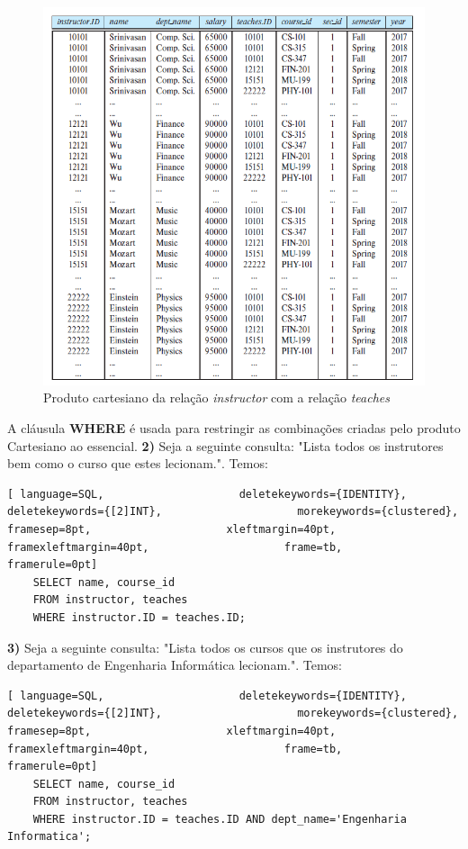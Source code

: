 \documentclass[oneside]{book}
\theoremstyle{definition}
\begin{document}
\begin{figure}[H]
    \centering
    \includegraphics[scale = 0.4]{cap2/prod_cartesiano.png}
    \caption{Produto cartesiano da relação \textit{instructor} com a relação \textit{teaches}}
\end{figure}

A cláusula \textbf{WHERE} é usada para restringir as combinações criadas pelo produto Cartesiano ao essencial.
\textbf{2)} Seja a seguinte consulta: "Lista todos os instrutores bem como o curso que estes lecionam.". Temos:
\begin{lstlisting}[ language=SQL,                     deletekeywords={IDENTITY},                     deletekeywords={[2]INT},                     morekeywords={clustered},                     framesep=8pt,                     xleftmargin=40pt,                     framexleftmargin=40pt,                     frame=tb,                     framerule=0pt]
    SELECT name, course_id
    FROM instructor, teaches
    WHERE instructor.ID = teaches.ID;
\end{lstlisting}

\textbf{3)} Seja a seguinte consulta: "Lista todos os cursos que os instrutores do departamento de Engenharia Informática lecionam.". Temos:
\begin{lstlisting}[ language=SQL,                     deletekeywords={IDENTITY},                     deletekeywords={[2]INT},                     morekeywords={clustered},                     framesep=8pt,                     xleftmargin=40pt,                     framexleftmargin=40pt,                     frame=tb,                     framerule=0pt]
    SELECT name, course_id
    FROM instructor, teaches
    WHERE instructor.ID = teaches.ID AND dept_name='Engenharia Informatica';
\end{lstlisting}
\end{document}
